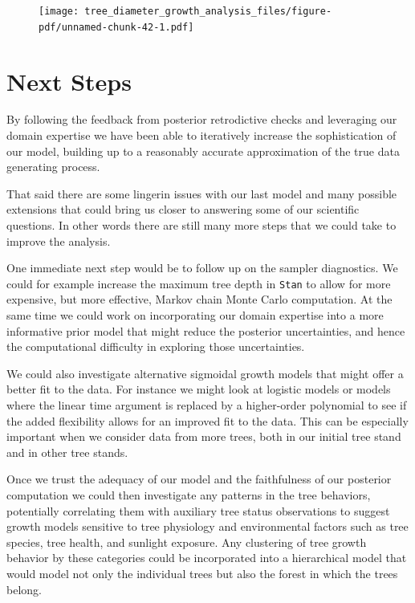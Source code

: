 \documentclass[
  letterpaper,
  DIV=11,
  numbers=noendperiod]{scrartcl}
\begin{document}
\begin{figure}[H]

{\centering \texttt{[image: tree\_diameter\_growth\_analysis\_files/figure-pdf/unnamed-chunk-42-1.pdf]}

}

\end{figure}

\hypertarget{next-steps}{%
\section{Next Steps}\label{next-steps}}

By following the feedback from posterior retrodictive checks and
leveraging our domain expertise we have been able to iteratively
increase the sophistication of our model, building up to a reasonably
accurate approximation of the true data generating process.

That said there are some lingerin issues with our last model and many
possible extensions that could bring us closer to answering some of our
scientific questions. In other words there are still many more steps
that we could take to improve the analysis.

One immediate next step would be to follow up on the sampler
diagnostics. We could for example increase the maximum tree depth in
\texttt{Stan} to allow for more expensive, but more effective, Markov
chain Monte Carlo computation. At the same time we could work on
incorporating our domain expertise into a more informative prior model
that might reduce the posterior uncertainties, and hence the
computational difficulty in exploring those uncertainties.

We could also investigate alternative sigmoidal growth models that might
offer a better fit to the data. For instance we might look at logistic
models or models where the linear time argument is replaced by a
higher-order polynomial to see if the added flexibility allows for an
improved fit to the data. This can be especially important when we
consider data from more trees, both in our initial tree stand and in
other tree stands.

Once we trust the adequacy of our model and the faithfulness of our
posterior computation we could then investigate any patterns in the tree
behaviors, potentially correlating them with auxiliary tree status
observations to suggest growth models sensitive to tree physiology and
environmental factors such as tree species, tree health, and sunlight
exposure. Any clustering of tree growth behavior by these categories
could be incorporated into a hierarchical model that would model not
only the individual trees but also the forest in which the trees belong.
\end{document}
